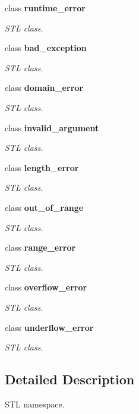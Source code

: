 \begin{CompactItemize}
class \textbf{runtime\_\-error}
\begin{CompactList}\small\item\em STL class. \item\end{CompactList}\item 
class \textbf{bad\_\-exception}
\begin{CompactList}\small\item\em STL class. \item\end{CompactList}\item 
class \textbf{domain\_\-error}
\begin{CompactList}\small\item\em STL class. \item\end{CompactList}\item 
class \textbf{invalid\_\-argument}
\begin{CompactList}\small\item\em STL class. \item\end{CompactList}\item 
class \textbf{length\_\-error}
\begin{CompactList}\small\item\em STL class. \item\end{CompactList}\item 
class \textbf{out\_\-of\_\-range}
\begin{CompactList}\small\item\em STL class. \item\end{CompactList}\item 
class \textbf{range\_\-error}
\begin{CompactList}\small\item\em STL class. \item\end{CompactList}\item 
class \textbf{overflow\_\-error}
\begin{CompactList}\small\item\em STL class. \item\end{CompactList}\item 
class \textbf{underflow\_\-error}
\begin{CompactList}\small\item\em STL class. \item\end{CompactList}\end{CompactItemize}


\subsection{Detailed Description}
STL namespace. 
